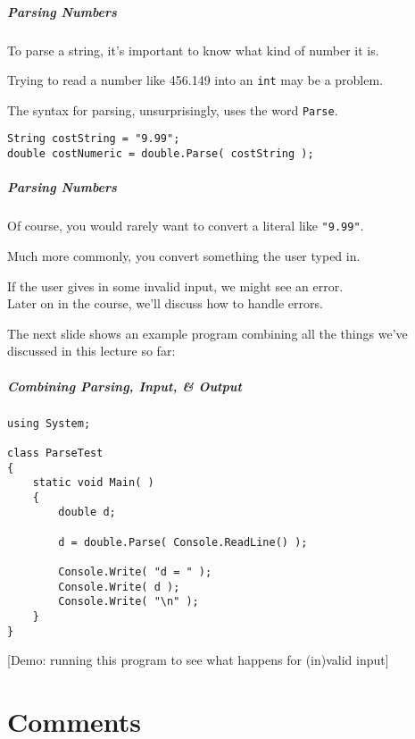 \begin{frame}
\frametitle{Parsing Numbers}
To parse a string, it's important to know what kind of number it is.

Trying to read a number like 456.149 into an \texttt{int} may be a problem.

The syntax for parsing, unsurprisingly, uses the word \texttt{Parse}.

\texttt{String costString = "9.99";}\\
\texttt{double costNumeric = double.Parse( costString );}

\end{frame}

\begin{frame}
\frametitle{Parsing Numbers}
Of course, you would rarely want to convert a literal like \texttt{"9.99"}.

Much more commonly, you convert something the user typed in.

If the user gives in some invalid input, we might see an error.\\
\quad Later on in the course, we'll discuss how to handle errors.

The next slide shows an example program combining all the things we've discussed in this lecture so far:

\end{frame}

\begin{frame}[fragile]
\frametitle{Combining Parsing, Input, \& Output}

\begin{verbatim}
using System;

class ParseTest
{
    static void Main( )
    {
        double d;

        d = double.Parse( Console.ReadLine() );

        Console.Write( "d = " );
        Console.Write( d );
        Console.Write( "\n" );
    }
}
\end{verbatim}

[Demo: running this program to see what happens for (in)valid input]

\end{frame}


\part{Comments}
\begin{frame}\partpage\end{frame}

